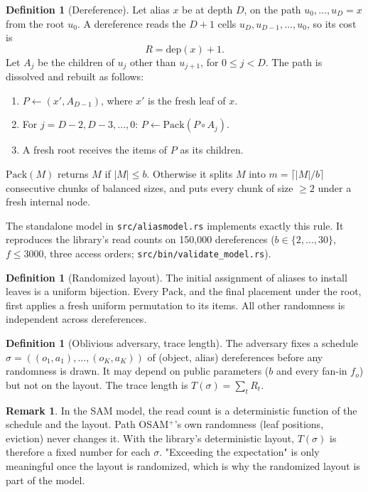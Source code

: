 \documentclass[11pt]{article}
\theoremstyle{definition}
\newtheorem{definition}[theorem]{Definition}
\newtheorem{remark}[theorem]{Remark}
\newcommand{\dep}{\mathrm{dep}}
\begin{document}
\begin{definition}[Dereference]
Let alias $x$ be at depth $D$, on the path $u_0,\dots,u_D=x$ from the root
$u_0$. A dereference reads the $D+1$ cells $u_D,u_{D-1},\dots,u_0$, so its
cost is
\[ R = \dep(x)+1. \]
Let $A_j$ be the children of $u_j$ other than $u_{j+1}$, for $0\le j<D$. The
path is dissolved and rebuilt as follows:
\begin{enumerate}
\item $P \leftarrow (x', A_{D-1})$, where $x'$ is the fresh leaf of $x$.
\item For $j=D-2,D-3,\dots,0$: $P\leftarrow \mathrm{Pack}(P\circ A_j)$.
\item A fresh root receives the items of $P$ as its children.
\end{enumerate}
$\mathrm{Pack}(M)$ returns $M$ if $|M|\le b$. Otherwise it splits $M$ into
$m=\lceil |M|/b\rceil$ consecutive chunks of balanced sizes, and puts every chunk
of size $\ge 2$ under a fresh internal node.
\end{definition}

The standalone model in \texttt{src/aliasmodel.rs} implements exactly this
rule. It reproduces the library's read counts on 150{,}000 dereferences
($b\in\{2,\dots,30\}$, $f\le 3000$, three access orders;
\texttt{src/bin/validate\_model.rs}).

\begin{definition}[Randomized layout]
The initial assignment of aliases to install leaves is a uniform bijection.
Every $\mathrm{Pack}$, and the final placement under the root, first applies a
fresh uniform permutation to its items. All other randomness is independent
across dereferences.
\end{definition}

\begin{definition}[Oblivious adversary, trace length]
The adversary fixes a schedule $\sigma=((o_1,a_1),\dots,(o_K,a_K))$ of
(object, alias) dereferences before any randomness is drawn. It may depend on
public parameters ($b$ and every fan-in $f_o$) but not on the layout. The trace
length is $T(\sigma)=\sum_{t} R_t$.
\end{definition}

\begin{remark}
In the SAM model, the read count is a deterministic function of the schedule
and the layout. Path OSAM$^+$'s own randomness (leaf positions, eviction)
never changes it. With the library's deterministic layout, $T(\sigma)$ is
therefore a fixed number for each $\sigma$. "Exceeding the expectation" is
only meaningful once the layout is randomized, which is why the randomized
layout is part of the model.
\end{remark}
\end{document}
